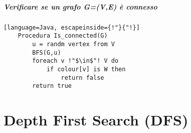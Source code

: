 \paragraph*{Verificare se un grafo G=(V,E) è connesso}
\begin{lstlisting}[language=Java, escapeinside={!"}{"!}]
    Procedura Is_connected(G)
        u = randm vertex from V
        BFS(G,u)
        foreach v !"$\in$"! V do
            if colour[v] is W then
                return false
        return true
\end{lstlisting}

\chapter{Depth First Search (DFS)}
